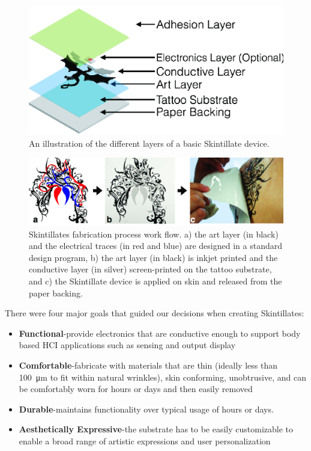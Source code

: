 \documentclass{sigchi}
\begin{document}
\begin{figure}[h]
\centering
\includegraphics[width=0.9\columnwidth]{figures/Figure4}
\caption{An illustration of the different layers of a basic Skintillate device.}
\vspace{-8pt}
\label{fig:layers}
\end{figure}

\begin{figure} [!ht]
\centering
\includegraphics[width=1.0\textwidth]{figures/Figure3}
\caption{Skintillates fabrication process work flow. a) the art layer (in black) and the electrical traces (in red and blue) are designed in a standard design program, b) the art layer (in black) is inkjet printed and the conductive layer (in silver) screen-printed on the tattoo substrate, and c) the Skintillate device is applied on skin and released from  the paper backing.}
\vspace{-8pt}
\label{fig:applicationprocess}
\end{figure}

 There were four major goals that guided our decisions when creating Skintillates:

\begin{itemize}
  \item \textbf{Functional}-provide electronics that are conductive enough to support body based HCI applications such as sensing and output display
  \item \textbf{Comfortable}-fabricate with materials that are thin (ideally less than 100\SI{}{\micro\metre} to fit within natural wrinkles), skin conforming, unobtrusive, and can be comfortably worn for hours or days and then easily removed
  \item \textbf{Durable}-maintains functionality over typical usage of hours or days. 
  \item \textbf{Aesthetically Expressive}-the substrate has to be easily customizable to enable a broad range of  artistic expressions and user personalization 
\end{itemize}
\end{document}
